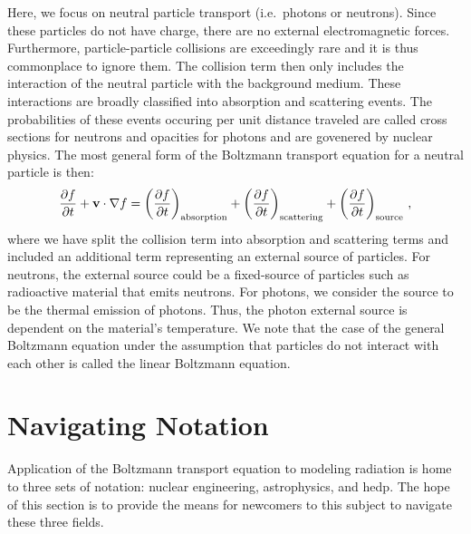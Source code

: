 \documentclass[../doc.tex]{subfiles}
\begin{document}
Here, we focus on neutral particle transport (i.e.~photons or neutrons). Since these particles do not have charge, there are no external electromagnetic forces. Furthermore, particle-particle collisions are exceedingly rare and it is thus commonplace to ignore them. The collision term then only includes the interaction of the neutral particle with the background medium. These interactions are broadly classified into absorption and scattering events. The probabilities of these events occuring per unit distance traveled are called cross sections for neutrons and opacities for photons and are govenered by nuclear physics. The most general form of the Boltzmann transport equation for a neutral particle is then: 
	\begin{equation} \label{trans:linboltz}
		\frac{\partial f}{\partial t} + \boldsymbol{\mathrm{v}} \cdot \nabla f = \left( \frac{\partial f}{\partial t} \right)_\text{absorption} + \left( \frac{\partial f}{\partial t} \right)_\text{scattering} + \left( \frac{\partial f}{\partial t} \right)_\text{source} \,,
	\end{equation}
where we have split the collision term into absorption and scattering terms and included an additional term representing an external source of particles. For neutrons, the external source could be a fixed-source of particles such as radioactive material that emits neutrons. For photons, we consider the source to be the thermal emission of photons. Thus, the photon external source is dependent on the material's temperature. We note that the case of the general Boltzmann equation under the assumption that particles do not interact with each other is called the linear Boltzmann equation. 

\section{Navigating Notation}
Application of the Boltzmann transport equation to modeling radiation is home to three sets of notation: nuclear engineering, astrophysics, and \gls{hedp}. The hope of this section is to provide the means for newcomers to this subject to navigate these three fields. 
\end{document}
